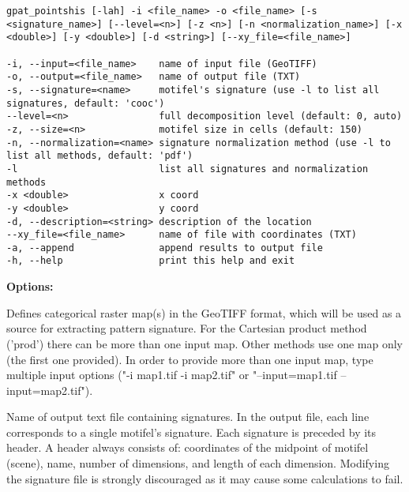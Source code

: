 \begin{minipage}{\linewidth}
\begin{lstlisting}
gpat_pointshis [-lah] -i <file_name> -o <file_name> [-s <signature_name>] [--level=<n>] [-z <n>] [-n <normalization_name>] [-x <double>] [-y <double>] [-d <string>] [--xy_file=<file_name>]

-i, --input=<file_name>    name of input file (GeoTIFF)
-o, --output=<file_name>   name of output file (TXT)
-s, --signature=<name>     motifel's signature (use -l to list all signatures, default: 'cooc')
--level=<n>                full decomposition level (default: 0, auto)
-z, --size=<n>             motifel size in cells (default: 150)
-n, --normalization=<name> signature normalization method (use -l to list all methods, default: 'pdf')
-l                         list all signatures and normalization methods
-x <double>                x coord
-y <double>                y coord
-d, --description=<string> description of the location
--xy_file=<file_name>      name of file with coordinates (TXT)
-a, --append               append results to output file
-h, --help                 print this help and exit
\end{lstlisting}
\end{minipage}

{\bf Options:}


Defines categorical raster map(s) in the GeoTIFF format, which will be used as a source for extracting pattern signature.
For the Cartesian product method ('prod') there can be more than one input map. 
Other methods use one map only (the first one provided). 
In order to provide more than one input map, type multiple input options ("-i map1.tif -i map2.tif" or "--input=map1.tif --input=map2.tif").


Name of output text file containing signatures. 
In the output file, each line corresponds to a single motifel's signature. 
Each signature is preceded by its header.
A header always consists of: coordinates of the midpoint of motifel (scene), name, number of dimensions, and length of each dimension. 
Modifying the signature file is strongly discouraged as it may cause some calculations to fail.


